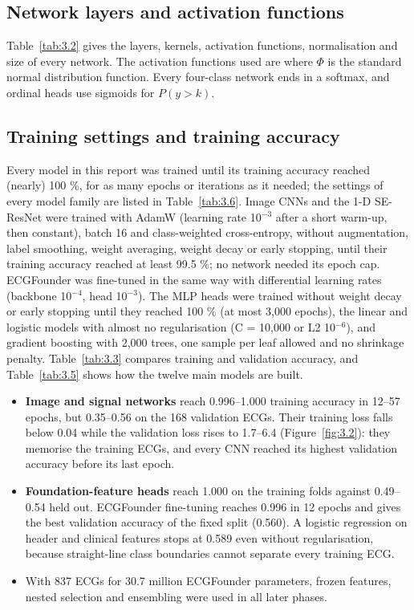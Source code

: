 \subsection{Network layers and activation functions}\label{sec:3.5.2}

Table~\ref{tab:3.2} gives the layers, kernels, activation functions, normalisation and size of every network. The activation functions used are
\EqThreeTwo
where $\Phi$ is the standard normal distribution function. Every four-class network ends in a softmax, and ordinal heads use sigmoids for $ P(y> k)$.

\subsection{Training settings and training accuracy}\label{sec:3.5.3}

Every model in this report was trained until its training accuracy reached (nearly) 100 \%, for as many epochs or iterations as it needed; the settings of every model family are listed in Table~\ref{tab:3.6}. Image CNNs and the 1-D SE-ResNet were trained with AdamW (learning rate 10$^{-3}$ after a short warm-up, then constant), batch 16 and class-weighted cross-entropy, without augmentation, label smoothing, weight averaging, weight decay or early stopping, until their training accuracy reached at least 99.5 \%; no network needed its epoch cap. ECGFounder was fine-tuned in the same way with differential learning rates (backbone 10$^{-4}$, head 10$^{-3}$). The MLP heads were trained without weight decay or early stopping until they reached 100 \% (at most 3,000 epochs), the linear and logistic models with almost no regularisation (C = 10,000 or L2 10$^{-6}$), and gradient boosting with 2,000 trees, one sample per leaf allowed and no shrinkage penalty. Table~\ref{tab:3.3} compares training and validation accuracy, and Table~\ref{tab:3.5} shows how the twelve main models are built.

\begin{itemize}
  \item \textbf{Image and signal networks} reach 0.996--1.000 training accuracy in 12--57 epochs, but 0.35--0.56 on the 168 validation ECGs. Their training loss falls below 0.04 while the validation loss rises to 1.7--6.4 (Figure~\ref{fig:3.2}): they memorise the training ECGs, and every CNN reached its highest validation accuracy before its last epoch.
  \item \textbf{Foundation-feature heads} reach 1.000 on the training folds against 0.49--0.54 held out. ECGFounder fine-tuning reaches 0.996 in 12 epochs and gives the best validation accuracy of the fixed split (0.560). A logistic regression on header and clinical features stops at 0.589 even without regularisation, because straight-line class boundaries cannot separate every training ECG.
  \item With 837 ECGs for 30.7 million ECGFounder parameters, frozen features, nested selection and ensembling were used in all later phases.
\end{itemize}
